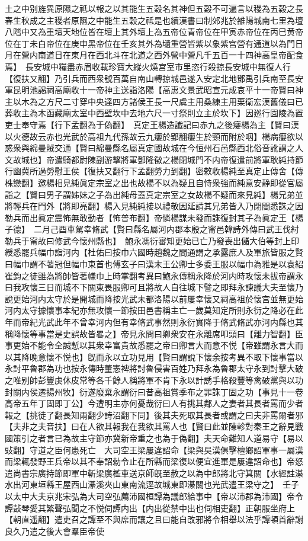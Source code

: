 土之中别旌異原隰之祗以報之以其能生五穀名其神但五穀不可遍言以稷為五穀之長春生秋成之主稷者原隰之中能生五穀之祗是也續漢書曰制郊兆於雒陽城南七里為壇八階中又為重壇天地位皆在壇上其外壇上為五帝位青帝位在甲寅赤帝位在丙巳黄帝位在丁未白帝位在庚申黑帝位在壬亥其外為壝重營皆紫以象紫宫營有通道以為門日月在營内南道日在東月在西北斗在北道之西外營中營凡千五百一十四神高皇帝配食焉】　長安城中糧盡赤眉收載珍寶大縱火燒宫室市里恣行殺掠長安城中無復人行【復扶又翻】乃引兵而西衆號百萬自南山轉掠城邑遂入安定北地鄧禹引兵南至長安軍昆明池謁祠高廟收十一帝神主送詣洛陽【高惠文景武昭宣元成哀平十一帝賢曰神主以木為之方尺二寸穿中央達四方諸侯王長一尺虞主用桑練主用栗衛宏漢舊儀曰已葬收主為木函藏廟太室中西壁坎中去地六尺一寸祭則立主於坎下】因廵行園陵為置吏士奉守焉【行下孟翻為于偽翻】　真定王楊造䜟記曰赤九之後癭楊為主【賢曰漢以火德故云赤也光武於高祖九代孫故云九癭於郢翻癭生於頸而附於咽】楊病癭欲以惑衆與綿曼賊交通【賢曰綿曼縣名屬真定國故城在今恒州石邑縣西北俗音訛謂之人文故城也】帝遣騎都尉陳副游擊將軍鄧隆徵之楊閉城門不内帝復遣前將軍耿純持節行幽冀所過勞慰王侯【復扶又翻行下孟翻勞力到翻】密敕收楊純至真定止傳舍【傳株戀翻】邀楊相見純眞定宗室之出也故楊不以為疑且自恃衆強而純意安静即從官屬詣之【賢曰男子謂姊妹之子為出純母蓋真定宗室之女故楊不疑而來見純】楊兄弟並將輕兵在門外【將即亮翻】楊入見純純接以禮敬因延請其兄弟皆入乃閉閤悉誅之因勒兵而出眞定震怖無敢動者【怖普布翻】帝憐楊謀未發而誅復封其子為眞定王【楊子德】　二月己酉車駕幸脩武【賢曰縣名屬河内郡本殷之甯邑韓詩外傳曰武王伐紂勒兵于甯故曰修武今懷州縣也】　鮑永馮衍審知更始已亡乃發喪出儲大伯等封上印綬悉罷兵幅巾詣河内【杜佑曰按巾六國時趙魏之間通謂之承露庶人及軍旅皆服之賢曰幅巾謂不著冠但幅巾束首也傅玄子曰漢末王公卿士多委王服以幅巾為雅是以袁紹崔鈞之徒雖為將帥皆著㡘巾上時掌翻考異曰鮑永傳稱永降於河内時攻懷未拔帝謂永曰我攻懷三日而城不下關東畏服卿可且將故人自往城下譬之即拜永諫議大夫至懷乃說更始河内太守於是開城而降按光武未都洛陽以前屢幸懷又祠高祖於懷宫並無更始河内太守據懷事本紀亦無攻懷一節按田邑書稱主亡一歲莫知定所則永衍之降必在此年而帝紀光武此年不曾幸河内但有幸脩武事然則永衍實降于脩武脩武亦河内縣也其稱降懷等事當是史誤故皆畧之】帝見永問曰卿衆安在永離席叩頭曰【離力智翻】臣事更始不能令全誠慙以其衆幸富貴故悉罷之帝曰卿言大而意不悦【帝雖謂永言大而以其降晚意懷不悦也】旣而永以立功見用【賢曰謂說下懷余按考異不取下懷事當以永討平魯郡為功也按永傳時董憲裨將討魯侵害百姓乃拜永為魯郡太守永到討擊大破之唯别帥彭豐虡休皮常等各千餘人稱將軍不肯下永以計誘手格殺豐等禽破黨與以功封關内侯遷揚州牧】衍遂廢棄永謂衍曰昔高祖賞季布之罪誅丁固之功【事見十一卷高帝五年丁固即丁公】今遭明主亦何憂哉衍曰人有挑其鄰人之妻者其長者罵而少者報之【挑徒了翻長知兩翻少詩沼翻下同】後其夫死取其長者或謂之曰夫非罵爾者邪【夫非之夫音扶】曰在人欲其報我在我欲其罵人也【賢曰此並陳軫對秦王之辭見戰國策引之者言已為故主守節亦冀新帝重之也為于偽翻】夫天命難知人道易守【易以䜴翻】守道之臣何患死亡　大司空王梁屢違詔命【梁與吳漢俱擊檀鄉詔軍事一屬漢而梁輒發野王兵帝以其不奉詔勅令止在所縣而梁復以便宜進軍是屢違詔命也】帝怒遣尚書宗廣持節即軍中斬梁廣檻車送京師旣至赦之以為中郎將北守箕關【水經註濝水出河東垣縣王屋西山濝溪夾山東南流逕故城東即濝關也光武遣王梁守之】　壬子以太中大夫京兆宋弘為大司空弘薦沛國桓譚為議郎給事中【帝以沛郡為沛國】帝令譚鼔琴愛其繁聲弘聞之不悦伺譚内出【内出從禁中出也伺相吏翻】正朝服坐府上【朝直遥翻】遣吏召之譚至不與席而讓之且曰能自改邪將令相舉以法乎譚頓首辭謝良久乃遣之後大會羣臣帝使